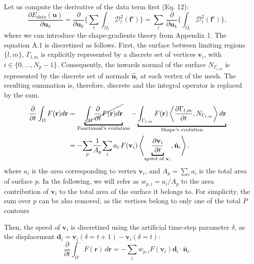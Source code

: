 \documentclass[a4paper]{report}
\providecommand{\mdist}[2]{ \mathcal{D}_{#2}^2(\mathbf{#1}) }
\renewcommand{\vec}[1]{\mathbf{#1}}
\begin{document}
Let us compute the derivative of the data term first (Eq. 12):
\begin{equation}
  \frac{\partial E_{data}(\vec{u})}{\partial \vec{u}_k} =
  \frac{ \partial }{\partial \vec{u}_k} \Big\{
  \underset{l}{\sum} \int_{\Omega_l} \mdist{f'}{l} \Big\} =
  \underset{l}{\sum} \, \frac{ \partial }{\partial \vec{u}_k} \Big\{
  \int_{\Omega_l} \mdist{f'}{l} \Big\},
  \label{eq:data_derivative}
\end{equation}
where we can introduce the shape-gradients theory from Appendix 1.
The equation A.1 is discretized as follows.
First, the surface between limiting regions $\{l, m\}$, $\Gamma_{l,m}$ is explicitly represented by
  a discrete set of vertices $\vec{v}_i$, with $i \in \{0, \ldots, N_p -1 \}$.
Consequently, the inwards normal of the surface $N_{\Gamma_{l,m}}$ is represented by the discrete
  set of normals $\hat{\vec{n}}_i$ at each vertex of the mesh.
The resulting summation is, therefore, discrete and the integral operator is replaced by the sum.
  \begin{align}
  \frac{\partial}{\partial t} \int_\Omega F(\vec{r}) d\vec{r} &=
  \underbracket{\cancel{\int_\Omega \frac{\partial}{\partial t}F(\vec{r}) d\vec{r} }}_{\text{Functional's evolution}}
  - \underbracket{\int_{\Gamma_{l,m}} F(\vec{r}) \left\langle \frac{\partial \Gamma_{l,m}}{\partial t},
  N_{\Gamma_{l,m}}\right\rangle d\vec{r}}_{\text{Shape's evolution}} \notag \\
  & = - \underset{p}{\sum} \frac{1}{A_p} \underset{i}{\sum} \, a_i \, F(\vec{v}_i) \left\langle \underbracket{\frac{\partial \vec{v}_i}{\partial t}}_{\text{speed of }\vec{v}_i},
  \hat{\vec{n}}_{i}\right\rangle.
  \label{eq:shape_gradient_orig}
  \end{align}
where $a_i$ is the area corresponding to vertex $\vec{v}_i$, and $A_p = \sum_i a_i$ is the total area of surface $p$.
In the following, we will refer as $w_{p,i} = a_i / A_p $ to the area contribution of $\vec{v}_i$ to the
  total area of the surface it belongs to.
For simplicity, the sum over $p$ can be also removed, as the vertices belong to only one of the total $P$ contours

Then, the speed of $\vec{v}_i$ is discretized using the artificial time-step parameter $\delta$, as the displacement
  $\vec{d}_i = \vec{v}_i(\delta = t+1) - \vec{v}_i(\delta = t)$:
  \begin{equation}
  \frac{\partial}{\partial t} \int_\Omega F(\vec{r}) \, d\vec{r} =
  - \underset{i}{\sum} w_{p,i} F(\vec{v}_i) \vec{d}_i \cdot \hat{\vec{n}}_i.
  \label{eq:shape_gradient_disc1}
  \end{equation}
\end{document}
